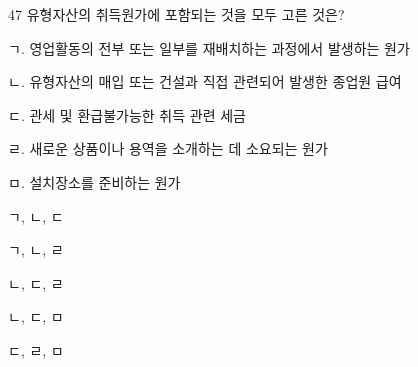 \begin{question}{47}
유형자산의 취득원가에 포함되는 것을 모두 고른 것은?
\begin{framedtext}
ㄱ. 영업활동의 전부 또는 일부를 재배치하는 과정에서 발생하는 원가 \par
ㄴ. 유형자산의 매입 또는 건설과 직접 관련되어 발생한 종업원 급여 \par
ㄷ. 관세 및 환급불가능한 취득 관련 세금 \par
ㄹ. 새로운 상품이나 용역을 소개하는 데 소요되는 원가 \par
ㅁ. 설치장소를 준비하는 원가 \par
\end{framedtext}
\begin{choices}
  \item ㄱ, ㄴ, ㄷ
  \item ㄱ, ㄴ, ㄹ
  \item ㄴ, ㄷ, ㄹ
  \item ㄴ, ㄷ, ㅁ
  \item ㄷ, ㄹ, ㅁ
\end{choices}
\end{question}
